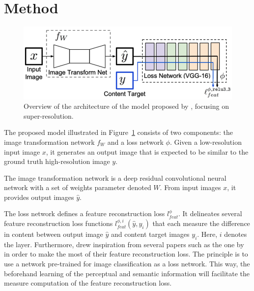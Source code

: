 \documentclass{article}
\begin{document}
{
    \section{Method}
    \label{sec:method}

    \begin{figure}[ht]
        \centering
        \includegraphics[width=\textwidth]{images/model.png}
        \caption{Overview of the architecture of the model proposed by \cite{sr}, focusing on super-resolution.}
        \label{fig:model}
    \end{figure}

    The proposed model illustrated in Figure~\ref{fig:model} consists of two components: the image transformation network $f_W$ and a loss network $\phi$. Given a low-resolution input image $x$, it generates an output image that is expected to be similar to the ground truth high-resolution image $y$.

    The image transformation network is a deep residual convolutional neural network with a set of weights parameter denoted $W$. From input images $x$, it provides output images $\hat y$.

    The loss network defines a feature reconstruction loss $l^\phi_{feat}$. It delineates several feature reconstruction loss functions $l^{\phi, i}_{feat}(\hat y, y_i)$ that each measure the difference in content between output image $\hat y$ and content target images $y_i$. Here, $i$ denotes the layer.
    Furthermore, \cite{sr} drew inspiration from several papers such as the one by \cite{gatys} in order to make the most of their feature reconstruction loss. The principle is to use a network pre-trained for image classification as a loss network. This way, the beforehand learning of the perceptual and semantic information will facilitate the measure computation of the feature reconstruction loss.

}
\end{document}
